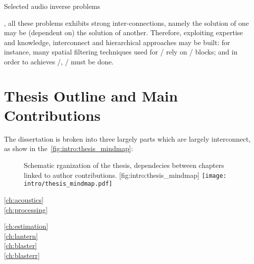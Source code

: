 \begin{table}[!h]

    \begin{fullwidth}
    \centering
    \small

    
    \caption{Selected audio inverse problems}
    \label{tab:processing:problems}

    \end{fullwidth}


\end{table}

, all these problems exhibits strong inter-connections,
namely the solution of one may be (dependent on) the solution of another.
Therefore, exploiting expertise and knowledge,
interconnect and hierarchical approaches may be built:
for instance, many spatial filtering techniques used for \SE/ rely on \SSL/ blocks;
and in order to achieves \RooGE/, \AER/ must be done.



\section{Thesis Outline and Main Contributions}

The dissertation is broken into three largely parts which are largely interconnect, as show in the~\cref{fig:intro:thesis_mindmap}:

\begin{figure}[t]
    \begin{sidecaption}{%
        Schematic rganization of the thesis, dependecies between chapters linked to author contributions.
    }[fig:intro:thesis_mindmap]
    \centering
    \texttt{[image: intro/thesis\_mindmap.pdf]}
    \end{sidecaption}
\end{figure}


\begin{description}
    \item[\cref{ch:acoustics}]\synopsisChAcoustics
    \item[\cref{ch:processing}]\synopsisChProcessing
\end{description}

\begin{description}
    \item[\cref{ch:estimation}]\synopsisChEstimation
    \item[\cref{ch:lantern}]\blindtext[1]
    \item[\cref{ch:blaster}]\blindtext[1]
    \item[\cref{ch:blasterr}]\blindtext[1]
\end{description}



